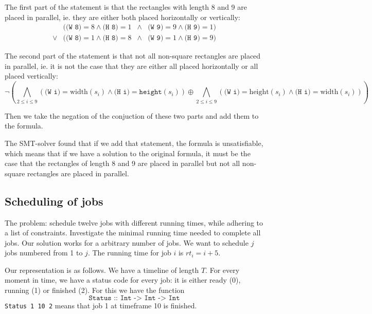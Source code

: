 \documentclass[12pt]{article}
\begin{document}

The first part of the statement is that the rectangles with length 8 and 9 are placed in parallel, 
ie. they are either both placed horizontally or vertically:\\
\[
    \begin{array}{rlcl}
    & (\texttt{(W 8)} = 8 \wedge \texttt{(H 8)} = 1 & \wedge & \texttt{(W 9)} = 9 \wedge \texttt{(H 9)} = 1) \\
    \vee & (\texttt{(W 8)} = 1 \wedge \texttt{(H 8)} = 8 & \wedge & \texttt{(W 9)} = 1 \wedge \texttt{(H 9)} = 9)
    \end{array}
\]

The second part of the statement is that 
not all non-square rectangles are placed in parallel, 
ie. it is not the case that they are either all placed horizontally or all placed vertically:
\[
\neg
\left(
\bigwedge_{2 \le i \le 9}
\left( 
\texttt{(W i)} = \text{width}(s_i) \wedge \texttt{(H i)} = \texttt{height}(s_i)
\right)
\oplus
\bigwedge_{2 \le i \le 9}
\left(
\texttt{(W i)} = \text{height}(s_i) \wedge \texttt{(H i)} = \text{width}(s_i)
\right)
\right)
\]

Then we take the negation of the conjuction of these two parts and add them to the formula.

The SMT-solver found that if we add that statement, the formula is unsatisfiable, which means that if we have a solution to the original formula, it must be the case that the rectangles of length 8 and 9 are placed in parallel but not all non-square rectangles are placed in parallel.


\subsection*{Scheduling of jobs}
The problem: schedule twelve jobs with different running times, while adhering to a list of constraints.
Investigate the minimal running time needed to complete all jobs.
Our solution works for a arbitrary number of jobs.
We want to schedule $j$ jobs numbered from 1 to $j$.
The running time for job $i$ is $rt_i = i+5$.

Our representation is as follows.
We have a timeline of length $T$.
For every moment in time, we have a status code for every job: it is either ready (0), running (1) or finished (2). 
For this we have the function 
\[\texttt{Status :: Int -> Int -> Int}\]
\texttt{Status 1 10 2} means that job 1 at timeframe 10 is finished. 
\end{document}
